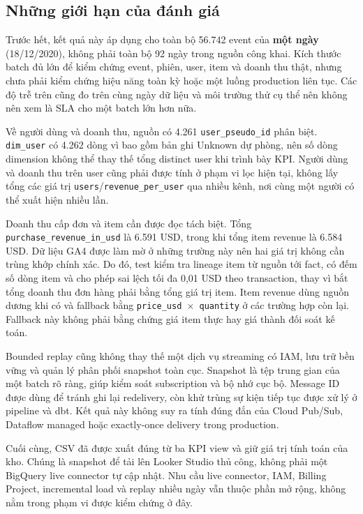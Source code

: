 \subsection{Những giới hạn của đánh giá}

Trước hết, kết quả này áp dụng cho toàn bộ 56.742 event của \textbf{một ngày} (18/12/2020), không phải toàn bộ 92 ngày trong nguồn công khai. Kích thước batch đủ lớn để kiểm chứng event, phiên, user, item và doanh thu thật, nhưng chưa phải kiểm chứng hiệu năng toàn kỳ hoặc một luồng production liên tục. Các độ trễ trên cũng đo trên cùng ngày dữ liệu và môi trường thử cụ thể nên không nên xem là SLA cho một batch lớn hơn nữa. \medskip

Về người dùng và doanh thu, nguồn có 4.261 \texttt{user\_pseudo\_id} phân biệt. \texttt{dim\_user} có 4.262 dòng vì bao gồm bản ghi Unknown dự phòng, nên số dòng dimension không thể thay thế tổng distinct user khi trình bày KPI. Người dùng và doanh thu trên user cũng phải được tính ở phạm vi lọc hiện tại, không lấy tổng các giá trị \texttt{users}/\texttt{revenue\_per\_user} qua nhiều kênh, nơi cùng một người có thể xuất hiện nhiều lần. \medskip

Doanh thu cấp đơn và item cần được đọc tách biệt. Tổng \texttt{purchase\_revenue\_in\_usd} là 6.591 USD, trong khi tổng item revenue là 6.584 USD. Dữ liệu GA4 được làm mờ ở những trường này nên hai giá trị không cần trùng khớp chính xác. Do đó, test kiểm tra lineage item từ nguồn tới fact, có đếm số dòng item và cho phép sai lệch tối đa 0,01 USD theo transaction, thay vì bắt tổng doanh thu đơn hàng phải bằng tổng giá trị item. Item revenue dùng nguồn dương khi có và fallback bằng \texttt{price\_usd $\times$ quantity} ở các trường hợp còn lại. Fallback này không phải bằng chứng giá item thực hay giá thành đối soát kế toán. \medskip

Bounded replay cũng không thay thế một dịch vụ streaming có IAM, lưu trữ bền vững và quản lý phân phối snapshot toàn cục. Snapshot là tệp trung gian của một batch rõ ràng, giúp kiểm soát subscription và bộ nhớ cục bộ. Message ID được dùng để tránh ghi lại redelivery, còn khử trùng sự kiện tiếp tục được xử lý ở pipeline và dbt. Kết quả này không suy ra tính đúng đắn của Cloud Pub/Sub, Dataflow managed hoặc exactly-once delivery trong production. \medskip

Cuối cùng, CSV đã được xuất đúng từ ba KPI view và giữ giá trị tính toán của kho. Chúng là snapshot để tải lên Looker Studio thủ công, không phải một BigQuery live connector tự cập nhật. Nhu cầu live connector, IAM, Billing Project, incremental load và replay nhiều ngày vẫn thuộc phần mở rộng, không nằm trong phạm vi được kiểm chứng ở đây. \medskip

